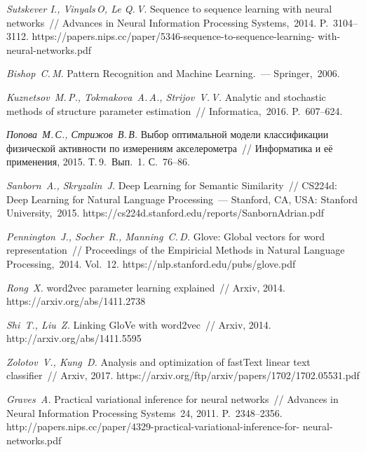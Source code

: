 \documentclass[12pt, fleqn, unicode]{article}
\begin{document}
\newpage

\begin{thebibliography}{99}
	\textit{Sutskever I., Vinyals\,O,  Le Q.\,V}. Sequence to sequence learning with neural networks~// Advances in Neural Information Processing Systems,~2014. P.~3104--3112. {\ttfamily https://papers.nips.cc/paper/5346-sequence-to-sequence-learning-
		with-neural-networks.pdf}
	
	\textit{Bishop~C.\,M}. Pattern Recognition and Machine Learning.~--- Springer,~2006.
	
	\textit{Kuznetsov~M.\,P., Tokmakova~A.\,A., Strijov~V.\,V.} Analytic and stochastic methods of structure parameter estimation~// Informatica,~2016. P.~607--624.
	
	\textit{Попова~М.\,С., Стрижов~В.\,В.} Выбор оптимальной модели классификации физической активности по измерениям акселерометра~// Информатика и её применения, 2015. Т.\,9.~Вып.~1. С.~76--86.
	
	\textit{Sanborn~A., Skryzalin~J.} 
	Deep Learning for Semantic Similarity~// CS224d: Deep Learning for Natural Language Processing~--- Stanford, CA, USA: Stanford University,~2015. {\ttfamily https://cs224d.stanford.edu/reports/SanbornAdrian.pdf}
	
	\textit{Pennington~J., Socher~R.,  Manning~C.\,D.} Glove: Global vectors for word representation~// Proceedings of the Empiricial Methods in Natural Language Processing,~2014. Vol.~12. {\ttfamily https://nlp.stanford.edu/pubs/glove.pdf}
	
	\textit{Rong~X.} word2vec parameter learning explained~// Arxiv, 2014. {\ttfamily https://arxiv.org/abs/1411.2738}
	
	\textit{Shi~T.,  Liu~Z.} Linking GloVe with word2vec~// Arxiv, 2014. {\ttfamily http://arxiv.org/abs/1411.5595 }
	
	\textit{Zolotov~V., Kung~D.}  Analysis and optimization of fastText linear text classifier~// Arxiv, 2017.
	{\ttfamily https://arxiv.org/ftp/arxiv/papers/1702/1702.05531.pdf}
	
	\textit{Graves~A.}
	Practical variational inference for neural networks~// Advances in Neural Information Processing Systems~24, 2011. P.~2348--2356. {\ttfamily  http://papers.nips.cc/paper/4329-practical-variational-inference-for-
		neural-networks.pdf}
	

\end{thebibliography}
\end{document}
